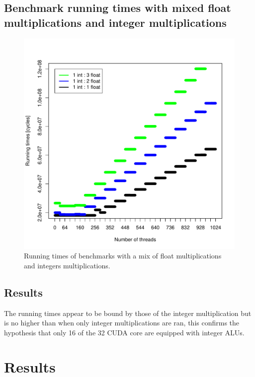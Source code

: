 \documentclass{report}
\def \scalingfactor{.8}
\begin{document}
	\subsection{Benchmark running times with mixed float multiplications and integer multiplications}
	\begin{figure}[H]
		\centering
		\vspace{-20pt}
        \includegraphics[width=\scalingfactor\linewidth]{"graphics/running_times_mixed"}
		\vspace{-15pt}
		\captionsetup{justification=centering}
        \caption{Running times of benchmarks with a mix of float multiplications and integers multiplications.}
    \end{figure}

    \subsection{Results}
    The running times appear to be bound by those of the integer multiplication but is no higher than
    when only integer multiplications are ran, this confirms the hypothesis that only 16 of the 32
    CUDA core are equipped with integer ALUs. 

\section{Results}
\end{document}
